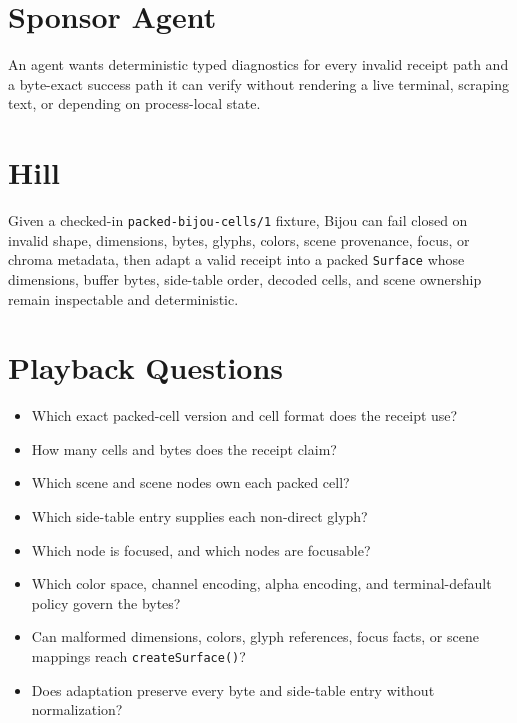 \section{Sponsor Agent}\label{record-164-sponsor-agent}

An agent wants deterministic typed diagnostics for every invalid receipt path and a byte-exact success path it can verify without rendering a live terminal, scraping text, or depending on process-local state.

\section{Hill}\label{record-164-hill}

Given a checked-in \texttt{p\allowbreak{}a\allowbreak{}c\allowbreak{}k\allowbreak{}e\allowbreak{}d\allowbreak{}-\allowbreak{}b\allowbreak{}i\allowbreak{}j\allowbreak{}o\allowbreak{}u\allowbreak{}-\allowbreak{}c\allowbreak{}e\allowbreak{}l\allowbreak{}l\allowbreak{}s\allowbreak{}/\allowbreak{}1} fixture, Bijou can fail closed on invalid shape, dimensions, bytes, glyphs, colors, scene provenance, focus, or chroma metadata, then adapt a valid receipt into a packed \texttt{S\allowbreak{}u\allowbreak{}r\allowbreak{}f\allowbreak{}a\allowbreak{}c\allowbreak{}e} whose dimensions, buffer bytes, side-table order, decoded cells, and scene ownership remain inspectable and deterministic.

\section{Playback Questions}\label{record-164-playback-questions}

\begin{itemize}
\tightlist
\item
  Which exact packed-cell version and cell format does the receipt use?
\item
  How many cells and bytes does the receipt claim?
\item
  Which scene and scene nodes own each packed cell?
\item
  Which side-table entry supplies each non-direct glyph?
\item
  Which node is focused, and which nodes are focusable?
\item
  Which color space, channel encoding, alpha encoding, and terminal-default policy govern the bytes?
\item
  Can malformed dimensions, colors, glyph references, focus facts, or scene mappings reach \texttt{c\allowbreak{}r\allowbreak{}e\allowbreak{}a\allowbreak{}t\allowbreak{}e\allowbreak{}S\allowbreak{}u\allowbreak{}r\allowbreak{}f\allowbreak{}a\allowbreak{}c\allowbreak{}e\allowbreak{}(\allowbreak{})}?
\item
  Does adaptation preserve every byte and side-table entry without normalization?
\end{itemize}

